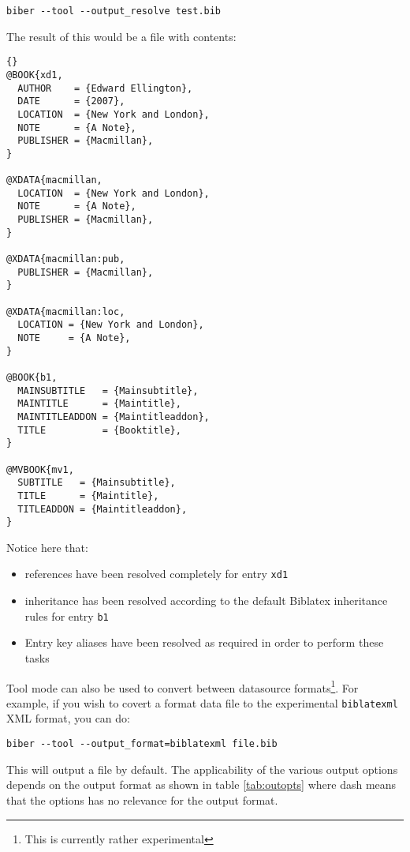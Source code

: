 \documentclass{ltxdockit}
\newcommand*{\biblatex}{Biblatex\xspace}
\begin{document}
\begin{verbatim}
biber --tool --output_resolve test.bib
\end{verbatim}
%
The result of this would be a file  with contents:

\begin{lstlisting}[style=bibtex, columns=fixed]{}
@BOOK{xd1,
  AUTHOR    = {Edward Ellington},
  DATE      = {2007},
  LOCATION  = {New York and London},
  NOTE      = {A Note},
  PUBLISHER = {Macmillan},
}

@XDATA{macmillan,
  LOCATION  = {New York and London},
  NOTE      = {A Note},
  PUBLISHER = {Macmillan},
}

@XDATA{macmillan:pub,
  PUBLISHER = {Macmillan},
}

@XDATA{macmillan:loc,
  LOCATION = {New York and London},
  NOTE     = {A Note},
}

@BOOK{b1,
  MAINSUBTITLE   = {Mainsubtitle},
  MAINTITLE      = {Maintitle},
  MAINTITLEADDON = {Maintitleaddon},
  TITLE          = {Booktitle},
}

@MVBOOK{mv1,
  SUBTITLE   = {Mainsubtitle},
  TITLE      = {Maintitle},
  TITLEADDON = {Maintitleaddon},
}
\end{lstlisting}
%
Notice here that:
\begin{itemize}
\item {} references have been resolved completely for entry
  \texttt{xd1}
\item {} inheritance has been resolved according to the
  default \biblatex inheritance rules for entry \texttt{b1}
\item Entry key aliases have been resolved as required in order to perform
  these tasks
\end{itemize}

Tool mode can also be used to convert between datasource
formats\footnote{This is currently rather experimental}. For example,
if you wish to covert a \bibtex format data file to the experimental
\texttt{biblatexml} XML format, you can do:

\begin{verbatim}
biber --tool --output_format=biblatexml file.bib
\end{verbatim}

\noindent This will output a file  by
default. The applicability of the various output options depends on
the output format as shown in table \ref{tab:outopts} where dash means that
the options has no relevance for the output format.
\end{document}

